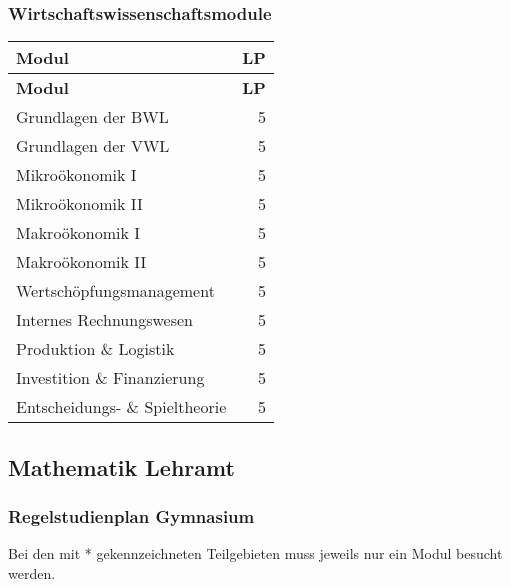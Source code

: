 \subsubsection{Wirtschaftswissenschaftsmodule}

\begin{singlespace}
	\begin{small}
		\begin{longtabu} to \textwidth {X|r}
			\toprule
			\textbf{Modul} & \textbf{LP} \\
			\midrule
			\endfirsthead
			\midrule
			\textbf{Modul} & \textbf{LP} \\
			\midrule
			\endhead
			\midrule
			\endfoot
			\bottomrule
			\endlastfoot
			Grundlagen der BWL & 5\\
			Grundlagen der VWL & 5\\
			Mikroökonomik I & 5\\
			Mikroökonomik II & 5\\
			Makroökonomik I & 5\\
			Makroökonomik II & 5\\
			Wertschöpfungsmanagement & 5\\
			Internes Rechnungswesen & 5\\
			Produktion \& Logistik & 5\\
			Investition \& Finanzierung & 5\\
			Entscheidungs- \& Spieltheorie & 5\\
		\end{longtabu}
	\end{small}
\end{singlespace}

\subsection{Mathematik Lehramt}
\label{studiengang_lehramt}

\subsubsection{Regelstudienplan Gymnasium}
\label{studiengang_lag}

Bei den mit * gekennzeichneten Teilgebieten muss jeweils nur ein Modul besucht werden.

